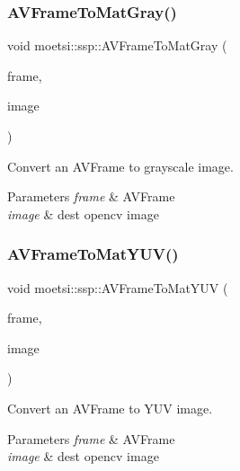 \subsubsection{\texorpdfstring{A\+V\+Frame\+To\+Mat\+Gray()}{AVFrameToMatGray()}}
{\footnotesize\ttfamily void moetsi\+::ssp\+::\+A\+V\+Frame\+To\+Mat\+Gray (\begin{DoxyParamCaption}\item[{A\+V\+Frame\+SharedP \&}]{frame,  }\item[{cv\+::\+Mat \&}]{image }\end{DoxyParamCaption})}



Convert an A\+V\+Frame to grayscale image. 


\begin{DoxyParams}{Parameters}
{\em frame} & A\+V\+Frame \\
\hline
{\em image} & dest opencv image \\
\hline
\end{DoxyParams}
\mbox{\label{namespacemoetsi_1_1ssp_a82e9b74b4a9a35255cc5d4ff66dc776f}} 
\subsubsection{\texorpdfstring{A\+V\+Frame\+To\+Mat\+Y\+U\+V()}{AVFrameToMatYUV()}}
{\footnotesize\ttfamily void moetsi\+::ssp\+::\+A\+V\+Frame\+To\+Mat\+Y\+UV (\begin{DoxyParamCaption}\item[{A\+V\+Frame\+SharedP \&}]{frame,  }\item[{cv\+::\+Mat \&}]{image }\end{DoxyParamCaption})}



Convert an A\+V\+Frame to Y\+UV image. 


\begin{DoxyParams}{Parameters}
{\em frame} & A\+V\+Frame \\
\hline
{\em image} & dest opencv image \\
\hline
\end{DoxyParams}
\mbox{\label{namespacemoetsi_1_1ssp_a357441ccde272e5d06fb708b62efa5c1}} 
